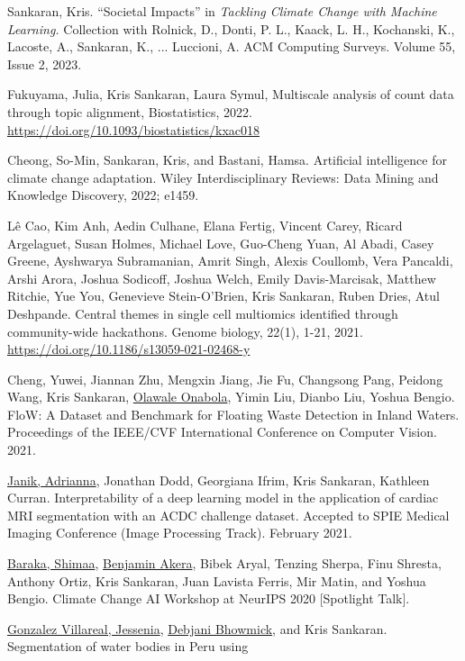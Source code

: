 \documentclass[letterpaper]{article}
\renewenvironment{itemize}{
  \begin{list}{}{
    \setlength{\leftmargin}{1.5em}
  }
}{
  \end{list}
}
\begin{document}
\begin{itemize}
\item Sankaran, Kris. ``Societal Impacts'' in \textit{Tackling Climate Change
with Machine Learning.} Collection with Rolnick, D., Donti, P. L., Kaack, L.
H., Kochanski, K., Lacoste, A., Sankaran, K., ... Luccioni, A. ACM Computing
Surveys. Volume 55, Issue 2, 2023.
\item Fukuyama, Julia, Kris Sankaran, Laura Symul, Multiscale analysis of count
data through topic alignment, Biostatistics, 2022.
\href{https://doi.org/10.1093/biostatistics/kxac018}{https://doi.org/10.1093/biostatistics/kxac018}
\item Cheong, So-Min, Sankaran, Kris, and Bastani, Hamsa. Artificial
intelligence for climate change adaptation. Wiley Interdisciplinary Reviews:
Data Mining and Knowledge Discovery, 2022; e1459.
\item Lê Cao, Kim Anh, Aedin Culhane, Elana Fertig, Vincent Carey, Ricard
  Argelaguet, Susan Holmes, Michael Love, Guo-Cheng Yuan, Al Abadi, Casey
  Greene, Ayshwarya Subramanian, Amrit Singh, Alexis Coullomb, Vera Pancaldi,
  Arshi Arora, Joshua Sodicoff, Joshua Welch, Emily Davis-Marcisak, Matthew
  Ritchie, Yue You, Genevieve Stein-O’Brien, Kris Sankaran, Ruben Dries, Atul
  Deshpande. Central themes in single cell multiomics identified through
  community-wide hackathons. Genome biology, 22(1), 1-21, 2021.
  \href{https://doi.org/10.1186/s13059-021-02468-y}{https://doi.org/10.1186/s13059-021-02468-y}
\item Cheng, Yuwei, Jiannan Zhu, Mengxin Jiang, Jie Fu, Changsong Pang,
Peidong Wang, Kris Sankaran, \underline{Olawale Onabola}, Yimin Liu, Dianbo Liu, Yoshua
Bengio. FloW: A Dataset and Benchmark for Floating Waste Detection in Inland
Waters. Proceedings of the IEEE/CVF International Conference on Computer
Vision. 2021.
\item \underline{Janik, Adrianna}, Jonathan Dodd, Georgiana Ifrim, Kris Sankaran, Kathleen
  Curran. Interpretability of a deep learning model in the application of
  cardiac MRI segmentation with an ACDC challenge dataset. Accepted to SPIE
  Medical Imaging Conference (Image Processing Track). February 2021.
\item \underline{Baraka, Shimaa}, \underline{Benjamin Akera}, Bibek Aryal,
Tenzing Sherpa, Finu Shresta, Anthony Ortiz, Kris Sankaran, Juan Lavista
Ferris, Mir Matin, and Yoshua Bengio. Climate Change AI Workshop at NeurIPS
2020 [Spotlight Talk].
\item \underline{Gonzalez Villareal, Jessenia}, \underline{Debjani Bhowmick},
and Kris Sankaran. Segmentation of water bodies in Peru using

\end{itemize}
\end{document}
